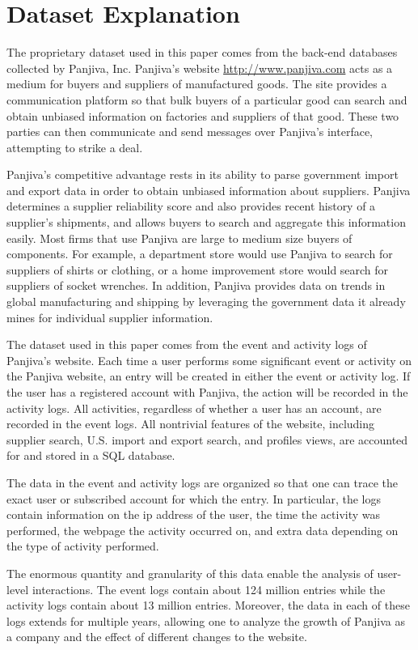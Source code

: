 \documentclass[10pt]{article}
\begin{document}
\section{Dataset Explanation}

The proprietary dataset used in this paper comes from the back-end databases collected by Panjiva, Inc. Panjiva's website \url{http://www.panjiva.com} acts as a medium for buyers and suppliers of manufactured goods. The site provides a communication platform so that bulk buyers of a particular good can search and obtain unbiased information on factories and suppliers of that good. These two parties can then communicate and send messages over Panjiva's interface, attempting to strike a deal. 

Panjiva's competitive advantage rests in its ability to parse government import and export data in order to obtain unbiased information about suppliers. Panjiva determines a supplier reliability score and also provides recent history of a supplier's shipments, and allows buyers to search and aggregate this information easily. Most firms that use Panjiva are large to medium size buyers of components. For example, a department store would use Panjiva to search for suppliers of shirts or clothing, or a home improvement store would search for suppliers of socket wrenches. In addition, Panjiva provides data on trends in global manufacturing and shipping by leveraging the government data it already mines for individual supplier information.

The dataset used in this paper comes from the event and activity logs of Panjiva's website. Each time a user performs some significant event or activity on the Panjiva website, an entry will be created in either the event or activity log. If the user has a registered account with Panjiva, the action will be recorded in the activity logs. All activities, regardless of whether a user has an account, are recorded in the event logs. All nontrivial features of the website, including supplier search, U.S. import and export search, and profiles views, are accounted for and stored in a SQL database.

The data in the event and activity logs are organized so that one can trace the exact user or subscribed account for which the entry. In particular, the logs contain information on the ip address of the user, the time the activity was performed, the webpage the activity occurred on, and extra data depending on the type of activity performed. 

The enormous quantity and granularity of this data enable the analysis of user-level interactions. The event logs contain about 124 million entries while the activity logs contain about 13 million entries. Moreover, the data in each of these logs extends for multiple years, allowing one to analyze the growth of Panjiva as a company and the effect of different changes to the website.
\end{document}
